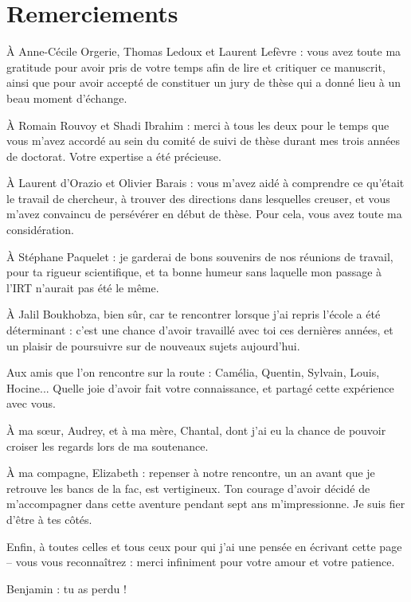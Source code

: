 \chapter*{Remerciements}

À Anne-Cécile Orgerie, Thomas Ledoux et Laurent Lefèvre : vous avez toute ma gratitude pour avoir pris de votre temps afin de lire et critiquer ce manuscrit, ainsi que pour avoir accepté de constituer un jury de thèse qui a donné lieu à un beau moment d'échange.

À Romain Rouvoy et Shadi Ibrahim : merci à tous les deux pour le temps que vous m'avez accordé au sein du comité de suivi de thèse durant mes trois années de doctorat. Votre expertise a été précieuse.

À Laurent d'Orazio et Olivier Barais : vous m'avez aidé à comprendre ce qu'était le travail de chercheur, à trouver des directions dans lesquelles creuser, et vous m'avez convaincu de persévérer en début de thèse. Pour cela, vous avez toute ma considération.

À Stéphane Paquelet : je garderai de bons souvenirs de nos réunions de travail, pour ta rigueur scientifique, et ta bonne humeur sans laquelle mon passage à l'IRT n'aurait pas été le même.

À Jalil Boukhobza, bien sûr, car te rencontrer lorsque j'ai repris l'école a été déterminant : c'est une chance d'avoir travaillé avec toi ces dernières années, et un plaisir de poursuivre sur de nouveaux sujets aujourd'hui.

Aux amis que l'on rencontre sur la route : Camélia, Quentin, Sylvain, Louis, Hocine... Quelle joie d'avoir fait votre connaissance, et partagé cette expérience avec vous.

À ma sœur, Audrey, et à ma mère, Chantal, dont j'ai eu la chance de pouvoir croiser les regards lors de ma soutenance.

À ma compagne, Elizabeth : repenser à notre rencontre, un an avant que je retrouve les bancs de la fac, est vertigineux. Ton courage d'avoir décidé de m'accompagner dans cette aventure pendant sept ans m'impressionne. Je suis fier d'être à tes côtés.

Enfin, à toutes celles et tous ceux pour qui j'ai une pensée en écrivant cette page -- vous vous reconnaîtrez : merci infiniment pour votre amour et votre patience.

{\color{white} Benjamin : tu as perdu !}

\clearpage

\vspace*{\fill}

